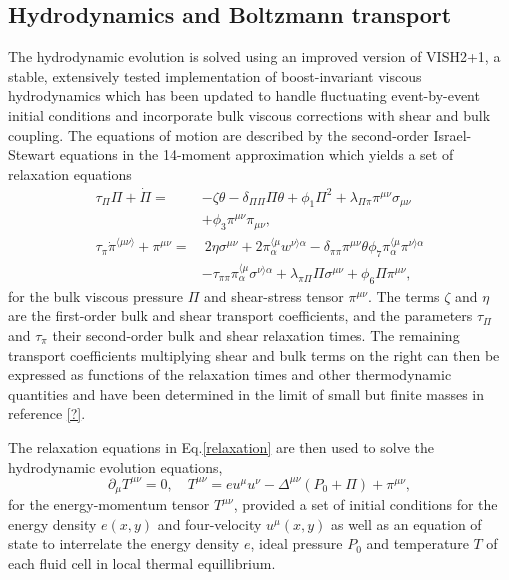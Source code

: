 \documentclass[aps,prc,reprint,amsmath]{revtex4-1}
\begin{document}
\subsection{Hydrodynamics and Boltzmann transport}
The hydrodynamic evolution is solved using an improved version of VISH2+1, a stable, extensively tested implementation of boost-invariant viscous hydrodynamics which has been updated to handle fluctuating event-by-event initial conditions and incorporate bulk viscous corrections with shear and bulk coupling. The equations of motion are described by the second-order Israel-Stewart equations in the 14-moment approximation which yields a set of relaxation equations
\begin{subequations}
\label{relaxation}
\begin{align}
    \tau_\Pi \Pi + \dot{\Pi} =& -\zeta \theta - \delta_{\Pi\Pi} \Pi\theta + \phi_1 \Pi^2 + \lambda_{\Pi\pi} \pi^{\mu\nu} \sigma_{\mu\nu} \nonumber \\ 
   &+\phi_3 \pi^{\mu\nu}\pi_{\mu\nu}, \\
    \tau_\pi \dot{\pi}^{\langle \mu\nu \rangle} + \pi^{\mu\nu} =& ~2\eta\sigma^{\mu\nu} + 2\pi_\alpha^{\langle \mu} w^{\nu \rangle \alpha} - \delta_{\pi\pi} \pi^{\mu\nu} \theta \phi_7 \pi_\alpha^{\langle \mu} \pi^{\nu \rangle \alpha} \nonumber \\
&-\tau_{\pi\pi} \pi_\alpha^{\langle \mu}\sigma^{\nu \rangle \alpha} + \lambda_{\pi\Pi} \Pi \sigma^{\mu\nu} + \phi_6 \Pi \pi^{\mu\nu},
\end{align}
\end{subequations}
for the bulk viscous pressure $\Pi$ and shear-stress tensor $\pi^{\mu\nu}$. The terms $\zeta$ and $\eta$ are the first-order bulk and shear transport coefficients, and the parameters $\tau_\Pi$ and $\tau_\pi$ their second-order bulk and shear relaxation times. The remaining transport coefficients multiplying shear and bulk terms on the right can then be expressed as functions of the relaxation times and other thermodynamic quantities and have been determined in the limit of small but finite masses in reference \ref{?}.

The relaxation equations in Eq.\eqref{relaxation} are then used to solve the hydrodynamic evolution equations,
\begin{equation}
\partial_\mu T^{\mu\nu} = 0, \quad T^{\mu\nu} = e u^\mu u^\nu  - \Delta^{\mu\nu} (P_0 + \Pi) + \pi^{\mu\nu},
\end{equation}
for the energy-momentum tensor $T^{\mu\nu}$, provided a set of initial conditions for the energy density $e(x,y)$ and four-velocity $u^\mu(x,y)$ as well as an equation of state to interrelate the energy density $e$, ideal pressure $P_0$ and temperature $T$ of each fluid cell in local thermal equillibrium.
\end{document}
